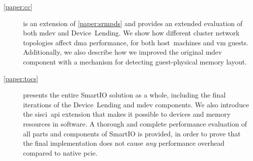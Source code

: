 \begin{description}
    \item[\cref{paper:cc}]
        is an extension of \cref{paper:srmpds} and provides an extended evaluation of both \gls{mdev} and Device~Lending.
        We show how different cluster network topologies affect \gls{dma} performance, for both \gls{host}~machines and \gls{vm} \glspl{guest}.
        Additionally, we also describe how we improved the original \gls{mdev} component with a mechanism for detecting \gls{guest}-physical memory layout.

    \item[\cref{paper:tocs}]
        presents the entire SmartIO solution as a whole, including the final iterations of the Device~Lending and \gls{mdev} components.
        We also introduce the \gls{sisci}~\gls{api} extension that makes it possible to  devices and memory resources in software.
        A thorough and complete performance evaluation of all parts and components of SmartIO is provided, in order to prove that the final implementation does not cause \emph{any} performance overhead compared to native \gls{pcie}.
\end{description}

